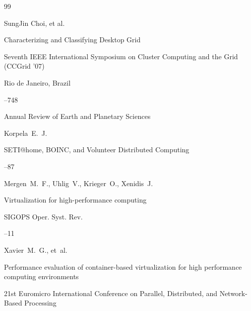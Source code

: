 \begin{thebibliography}{99}

\by SungJin Choi, et al.


\paper Characterizing and  Classifying Desktop Grid

\inbook Seventh IEEE International Symposium on Cluster Computing and the Grid (CCGrid '07)

\publaddr Rio de Janeiro, Brazil


--748






\jour  Annual Review of Earth and Planetary Sciences

\by Korpela~E.~J.

\paper SETI@home, BOINC, and Volunteer Distributed Computing




--87







\by Mergen~M.~F., Uhlig~V., Krieger~O., Xenidis~J.

\paper Virtualization for  high-performance computing

\jour  SIGOPS Oper. Syst. Rev. 




--11







\by Xavier~M.~G.,  et~al.


\paper Performance evaluation   of container-based virtualization for high performance computing   environments 

\inbook 21st Euromicro International Conference on Parallel, Distributed, and Network-Based Processing


\end{thebibliography}
